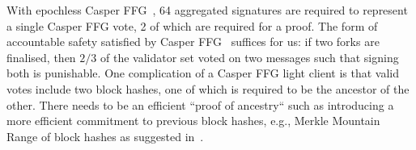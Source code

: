 With epochless Casper FFG~\cite{Gasper}, 64 aggregated signatures are required to represent a single Casper FFG vote, 2 of which are required for a proof. The form of accountable safety 
satisfied by Casper FFG~\cite{CasperFFG} suffices for us: if two forks are finalised, then $2/3$ of the validator set voted on two messages such that signing both is punishable. One complication 
of a Casper FFG light client is that valid votes include two block hashes, one of which is required to be the ancestor of the other. There needs to be an efficient ``proof of ancestry`` such as introducing 
a more efficient commitment to previous block hashes, e.g., Merkle Mountain Range of block hashes as suggested in~\cite{flyclient}.
